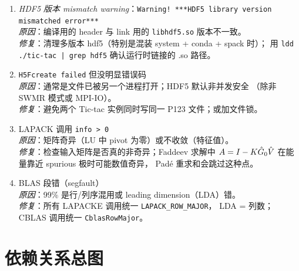 \begin{pitfallbox}[title={GSL/LAPACK/HDF5 三库的高频踩坑}]
\begin{enumerate}
\item \emph{HDF5 版本 mismatch warning}：\texttt{Warning! ***HDF5 library version
      mismatched error***}\\
      \emph{原因}：编译用的 header 与 link 用的 \texttt{libhdf5.so} 版本不一致。\\
      \emph{修复}：清理多版本 hdf5（特别是混装 system + conda + spack 时）；
      用 \texttt{ldd ./tic-tac | grep hdf5} 确认运行时链接的 .so 路径。

\item \texttt{H5Fcreate failed} 但没明显错误码\\
      \emph{原因}：通常是文件已被另一个进程打开；HDF5 默认非并发安全
      （除非 SWMR 模式或 MPI-IO）。\\
      \emph{修复}：避免两个 Tic-tac 实例同时写同一 P123 文件；或加文件锁。

\item LAPACK 调用 \texttt{info > 0}\\
      \emph{原因}：矩阵奇异（LU 中 pivot 为零）或不收敛（特征值）。\\
      \emph{修复}：检查输入矩阵是否真的非奇异；Faddeev 求解中
      $A=I-K\hat{G}_0\hat{V}$ 在能量靠近 spurious 极时可能数值奇异，
      Padé 重求和会跳过这种点。

\item BLAS 段错（segfault）\\
      \emph{原因}：99\% 是行/列序混用或 leading dimension（LDA）错。\\
      \emph{修复}：所有 LAPACKE 调用统一 \texttt{LAPACK\_ROW\_MAJOR}，
      LDA = 列数；CBLAS 调用统一 \texttt{CblasRowMajor}。

\end{enumerate}
\end{pitfallbox}

\section{依赖关系总图}

